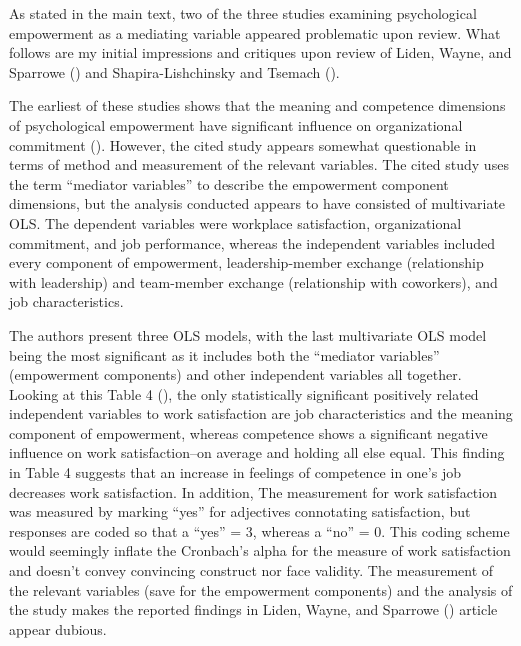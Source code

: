 \documentclass[
  11pt,
  a4paper,
]{article}
\begin{document}
As stated in the main text, two of the three studies examining
psychological empowerment as a mediating variable appeared problematic
upon review. What follows are my initial impressions and critiques upon
review of Liden, Wayne, and Sparrowe ()
and Shapira-Lishchinsky and Tsemach
().

The earliest of these studies shows that the meaning and competence
dimensions of psychological empowerment have significant influence on
organizational commitment (). However, the cited study appears somewhat questionable
in terms of method and measurement of the relevant variables. The cited
study uses the term ``mediator variables'' to describe the empowerment
component dimensions, but the analysis conducted appears to have
consisted of multivariate OLS. The dependent variables were workplace
satisfaction, organizational commitment, and job performance, whereas
the independent variables included every component of empowerment,
leadership-member exchange (relationship with leadership) and
team-member exchange (relationship with coworkers), and job
characteristics.

The authors present three OLS models, with the last multivariate OLS
model being the most significant as it includes both the ``mediator
variables'' (empowerment components) and other independent variables all
together. Looking at this Table 4 (), the only statistically significant
positively related independent variables to work satisfaction are job
characteristics and the meaning component of empowerment, whereas
competence shows a significant negative influence on work
satisfaction--on average and holding all else equal. This finding in
Table 4 suggests that an increase in feelings of competence in one's job
decreases work satisfaction. In addition, The measurement for work
satisfaction was measured by marking ``yes'' for adjectives connotating
satisfaction, but responses are coded so that a ``yes'' = 3, whereas a
``no'' = 0. This coding scheme would seemingly inflate the Cronbach's
alpha for the measure of work satisfaction and doesn't convey convincing
construct nor face validity. The measurement of the relevant variables
(save for the empowerment components) and the analysis of the study
makes the reported findings in Liden, Wayne, and Sparrowe
() article appear dubious.
\end{document}
